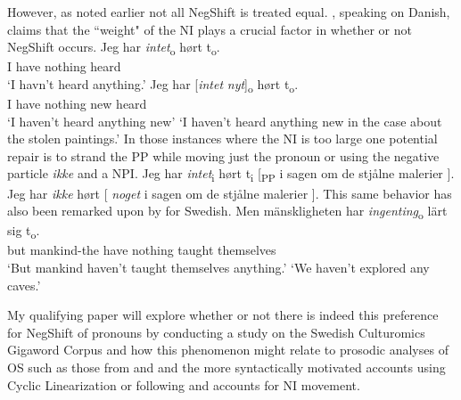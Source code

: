 \documentclass[12pt, letterpaper]{article}
\begin{document}
However, as noted earlier not all NegShift is treated equal. \citet[65f]{christensenInterfacesNegationSyntax2005}, speaking on Danish, claims that the ``weight" of the NI plays a crucial factor in whether or not NegShift occurs. 
	\ea \label{ex:weight}
		\ea 
		\gll Jeg har \textit{intet}\textsubscript{o} hørt t\textsubscript{o}.\\
		I have nothing heard\\
		\glt  `I havn't heard anything.'
		\ex 
		\gll Jeg har [\textit{intet} \textit{nyt}]\textsubscript{o} hørt t\textsubscript{o}.\\
		I have nothing new heard\\
		\glt `I haven't heard anything new'
		\glt `I haven't heard anything new in the case about the stolen paintings.'
		\z 
	\z
In those instances where the NI is too large one potential repair is to strand the PP while moving just the pronoun or using the negative particle \textit{ikke} and a NPI.
	\ea 
		\ea Jeg har \textit{intet}\textsubscript{i} hørt t\textsubscript{i} [\textsubscript{PP} i sagen om de stjålne malerier ]. \label{ex:split}
		\ex Jeg har \textit{ikke} hørt [ \textit{noget} i sagen om de stjålne malerier ].
		\z 
	\z   
This same behavior has also been remarked upon by \citet{penkaNegativeIndefinites2011} for Swedish.
	\ea 
		\ea 
		\gll Men mänskligheten har \textit{ingenting}\textsubscript{o} lärt sig t\textsubscript{o}.\\
		but mankind-the have nothing taught themselves\\
		\glt `But mankind haven't taught themselves anything.'
		\glt `We haven't explored any caves.'
		\z 
	\z 

My qualifying paper will explore whether or not there is indeed this preference for NegShift of pronouns by conducting a study on the Swedish Culturomics Gigaword Corpus \citep{eideSwedishCulturomicsGigaword2016} and how this phenomenon might relate to prosodic analyses of OS such as those from \citet{erteschik-shirVariationMainlandScandinavian2020} and \citet{brinkerhoffMATCHINGPhrasesNorwegian2020} and the more syntactically motivated accounts using Cyclic Linearization \citep{foxCyclicLinearizationSyntactic2005,engelsScandinavianNegativeIndefinites2012} or following \citet{zeijlstraSyntacticallyComplexStatus2011} and  accounts for NI movement.
\end{document}
